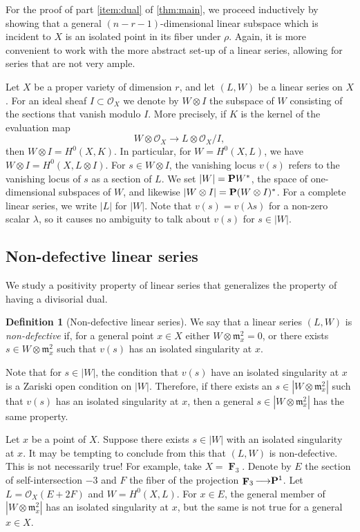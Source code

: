 \documentclass[11pt,reqno]{amsart}
\theoremstyle{plain}
\theoremstyle{definition}
\newtheorem{definition}[theorem]{Definition}
\theoremstyle{remark}
\numberwithin{equation}{section}
\DeclareMathOperator{\F}{\mathbf F}
\renewcommand{\to}{{\longrightarrow}}
\numberwithin{equation}{section}
\renewcommand{\O}{\mathcal O}
\begin{document}
For the proof of part \eqref{item:dual} of \autoref{thm:main}, we proceed inductively by showing that a general $(n-r-1)$-dimensional linear subspace which is incident to $X$ is an isolated point in its fiber under $\rho$.
Again, it is more convenient to work with the more abstract set-up of a linear series, allowing for series that are not very ample.

Let $X$ be a proper variety of dimension $r$, and let $(L, W)$ be a linear series on $X$.
For an ideal sheaf $I \subset \O_X$ we denote by $W \otimes I$ the subspace of $W$ consisting of the sections that vanish modulo $I$. %
More precisely, if $K$ is the kernel of the evaluation map
\[ W \otimes \O_X \to L \otimes \O_X/I,\]
then $W \otimes I = H^0(X, K)$.
In particular, for $W = H^0(X, L)$, we have $W \otimes I = H^0(X, L \otimes I)$.
For $s \in W \otimes I$, the vanishing locus $v(s)$ refers to the vanishing locus of $s$ as a section of $L$.
We set $|W| = \P W^*$, the space of one-dimensional subspaces of $W$, and likewise $|W \otimes I| = \P (W \otimes I)^*$.
For a complete linear series, we write $|L|$ for $|W|$.
Note that $v(s) = v(\lambda s)$ for a non-zero scalar $\lambda$, so it causes no ambiguity to talk about $v(s)$ for $s \in |W|$.

\subsection{Non-defective linear series}\label{sec:non-defectivity}
We study a positivity property of linear series that generalizes the property of having a divisorial dual.
\begin{definition}[Non-defective linear series]
  \label{def:genericallynon-defective} 
  We say that a linear series $(L, W)$ is \emph{non-defective} if,  for a general point $x \in X$ either $W \otimes \mathfrak m_x^2 = 0$, or there exists $s \in W \otimes \mathfrak m_x^2$ such that $v(s)$ has an isolated singularity at $x$.
\end{definition}
Note that for $s \in |W|$, the condition that $v(s)$ have an isolated singularity at $x$ is a Zariski open condition on $|W|$.
Therefore, if there exists an $s \in |W \otimes \mathfrak m_x^2|$ such that $v(s)$ has an isolated singularity at $x$, then a general $s \in |W \otimes \mathfrak m_x^2|$ has the same property.
\begin{remark}
  Let $x$ be a point of $X$.
  Suppose there exists $s \in |W|$ with an isolated singularity at $x$.
  It may be tempting to conclude from this that $(L, W)$ is non-defective.
  This is not necessarily true!
  For example, take $X = \F_3$.
  Denote by $E$ the section of self-intersection $-3$ and $F$ the fiber of the projection $\F_3 \to \P^1$.
  Let $L = \O_X(E + 2F)$ and $W = H^0(X, L)$.
  For $x \in E$, the general member of $|W \otimes \mathfrak m_x^2|$ has an isolated singularity at $x$, but the same is not true for a general $x \in X$.
\end{remark}
\end{document}

